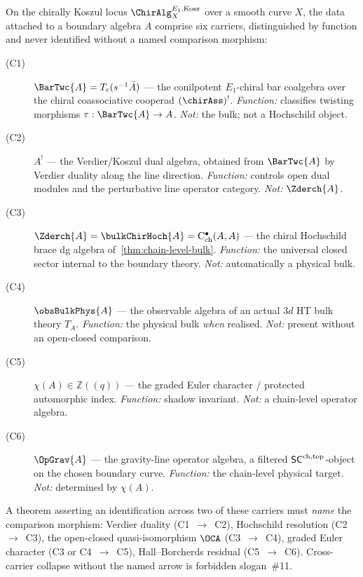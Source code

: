 \begin{definition}
\label{def:six-typed-carriers}
%
%
On the chirally Koszul locus $\ChirAlg_{X}^{E_{1},\mathrm{Kosz}}$ over
a smooth curve $X$, the data attached to a boundary algebra $A$ comprise
six carriers, distinguished by function and never identified without
a named comparison morphism:
\begin{description}
\item[\textup{(C1)}] $\BarTwc{A} = T_{c}(s^{-1}\bar{A})$ --- the
conilpotent $E_{1}$-chiral bar coalgebra over the chiral coassociative
cooperad $(\chirAss)^{!}$. \emph{Function:} classifies twisting
morphisms $\tau : \BarTwc{A} \to A$. \emph{Not:} the bulk; not a
Hochschild object.
\item[\textup{(C2)}] $A^{!}$ --- the Verdier/Koszul dual algebra,
obtained from $\BarTwc{A}$ by Verdier duality along the line direction.
\emph{Function:} controls open dual modules and the perturbative line
operator category. \emph{Not:} $\Zderch{A}$.
\item[\textup{(C3)}] $\Zderch{A} = \bulkChirHoch{A} =
\mathrm{C}^{\bullet}_{\mathrm{ch}}(A,A)$ --- the chiral Hochschild
brace dg algebra of~\cref{thm:chain-level-bulk}. \emph{Function:} the
universal closed sector internal to the boundary theory. \emph{Not:}
automatically a physical bulk.
\item[\textup{(C4)}] $\obsBulkPhys{A}$ --- the observable algebra of
an actual $3d$ HT bulk theory $T_{A}$. \emph{Function:} the physical
bulk \emph{when} realised. \emph{Not:} present without an open-closed
comparison.
\item[\textup{(C5)}] $\chi(A) \in \mathbb{Z}((q))$ --- the graded
Euler character / protected automorphic index. \emph{Function:} shadow
invariant. \emph{Not:} a chain-level operator algebra.
\item[\textup{(C6)}] $\OpGrav{A}$ --- the gravity-line operator
algebra, a filtered $\mathsf{SC}^{\mathrm{ch},\mathrm{top}}$-object on the chosen boundary curve.
\emph{Function:} the chain-level physical target. \emph{Not:} determined
by $\chi(A)$.
\end{description}
A theorem asserting an identification across two of these carriers
must \emph{name} the comparison morphism: Verdier duality
(C1~$\to$~C2), Hochschild resolution (C2~$\to$~C3), the open-closed
quasi-isomorphism $\OCA$ (C3~$\to$~C4), graded Euler character
(C3 or C4~$\to$~C5), Hall--Borcherds residual (C5~$\to$~C6).
Cross-carrier collapse without the named arrow is forbidden
slogan~\#11.
\end{definition}

